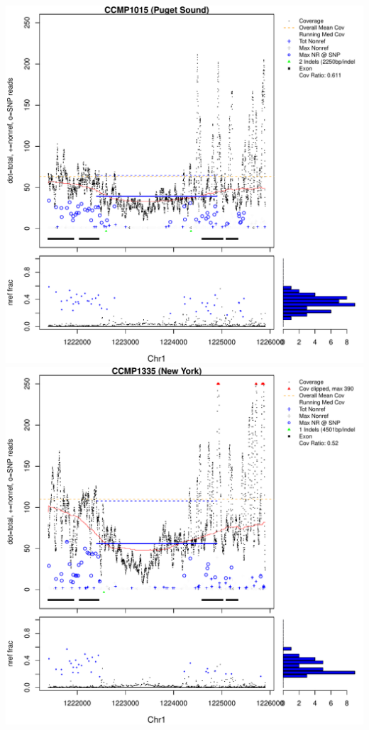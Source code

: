 \documentclass{article}\usepackage[]{graphicx}\usepackage[]{color}
\makeatletter
\def\maxwidth{ %
  \ifdim\Gin@nat@width>\linewidth
    \linewidth
  \else
    \Gin@nat@width
  \fi
}
\newenvironment{knitrout}{}{} %
\makeatother
\begin{document}
\begin{knitrout}
{\centering \includegraphics[width=\maxwidth]{figs-knitr/unnamed-chunk-46-1} 
\includegraphics[width=\maxwidth]{figs-knitr/unnamed-chunk-46-2} 

}



\end{knitrout}
\end{document}

